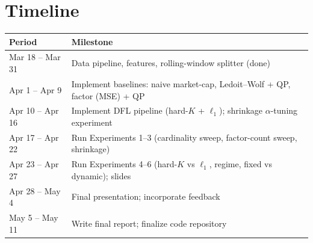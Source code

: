 \documentclass[11pt]{article}
\begin{document}
\section{Timeline}

\begin{table}[h]
\centering
\begin{tabular}{@{}ll@{}}
\toprule
\textbf{Period} & \textbf{Milestone} \\
\midrule
Mar 18 -- Mar 31 & Data pipeline, features, rolling-window splitter (done) \\
Apr 1 -- Apr 9   & Implement baselines: naive market-cap, Ledoit--Wolf + QP, factor (MSE) + QP \\
Apr 10 -- Apr 16 & Implement DFL pipeline (hard-$K$ + $\ell_1$); shrinkage $\alpha$-tuning experiment \\
Apr 17 -- Apr 22 & Run Experiments 1--3 (cardinality sweep, factor-count sweep, shrinkage) \\
Apr 23 -- Apr 27 & Run Experiments 4--6 (hard-$K$ vs $\ell_1$, regime, fixed vs dynamic); slides \\
Apr 28 -- May 4  & Final presentation; incorporate feedback \\
May 5 -- May 11  & Write final report; finalize code repository \\
\bottomrule
\end{tabular}
\end{table}


\end{document}
